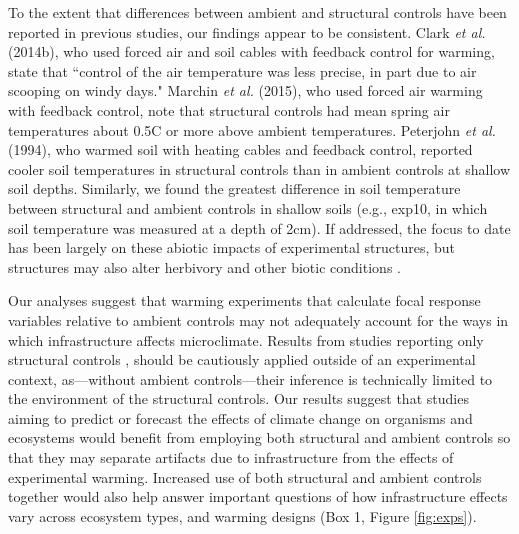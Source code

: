 \documentclass{article}
\begin{document}
\par To the extent that differences between ambient and structural controls have been reported in previous studies, our findings appear to be consistent. Clark \textit{et al.} (2014b), who used forced air and soil cables with feedback control for warming, state that ``control of the air temperature was less precise, in part due to air scooping on windy days." Marchin \textit{et al.} (2015), who used forced air warming with feedback control, note that structural controls had mean spring air temperatures about 0.5\degree C or more above ambient temperatures. Peterjohn \textit{et al.} (1994), who warmed soil with heating cables and feedback control, reported cooler soil temperatures in structural controls than in ambient controls at shallow soil depths. Similarly, we found the greatest difference in soil temperature between structural and ambient controls in shallow soils (e.g., exp10, in which soil temperature was measured at a depth of 2cm). If addressed, the focus to date has been largely on these abiotic impacts of experimental structures, but structures may also alter herbivory and other biotic conditions \citep{kennedy1995,moise2010,wolkovich2012,hoeppner2012}. 

\par Our analyses suggest that warming experiments that calculate focal response variables relative to ambient controls \citep[e.g.,][]{price1998,dunne2003,cleland2006,morin2010,marchin2015} may not adequately account for the ways in which infrastructure affects microclimate. Results from studies reporting only structural controls \citep [e.g.,][]{sherry2007,hoeppner2012, rollinson2012}, should be cautiously applied outside of an experimental context, as---without ambient controls---their inference is technically limited to the environment of the structural controls. Our results suggest that studies aiming to predict or forecast the effects of climate change on organisms and ecosystems would benefit from employing both structural and ambient controls so that they may separate artifacts due to infrastructure from the effects of experimental warming. Increased use of both structural and ambient controls together would also help answer important questions of how infrastructure effects vary across ecosystem types, and warming designs (Box 1, Figure \ref{fig:exps}). 
\end{document}
